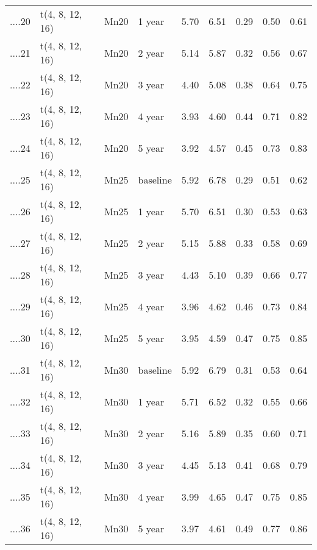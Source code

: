 \begin{table}[ht]
\begin{tabular}{rlllrrrrr}
  ....20 & t(4, 8, 12, 16) & Mn20 & 1 year & 5.70 & 6.51 & 0.29 & 0.50 & 0.61 \\ 
  ....21 & t(4, 8, 12, 16) & Mn20 & 2 year & 5.14 & 5.87 & 0.32 & 0.56 & 0.67 \\ 
  ....22 & t(4, 8, 12, 16) & Mn20 & 3 year & 4.40 & 5.08 & 0.38 & 0.64 & 0.75 \\ 
  ....23 & t(4, 8, 12, 16) & Mn20 & 4 year & 3.93 & 4.60 & 0.44 & 0.71 & 0.82 \\ 
  ....24 & t(4, 8, 12, 16) & Mn20 & 5 year & 3.92 & 4.57 & 0.45 & 0.73 & 0.83 \\ 
  ....25 & t(4, 8, 12, 16) & Mn25 & baseline & 5.92 & 6.78 & 0.29 & 0.51 & 0.62 \\ 
  ....26 & t(4, 8, 12, 16) & Mn25 & 1 year & 5.70 & 6.51 & 0.30 & 0.53 & 0.63 \\ 
  ....27 & t(4, 8, 12, 16) & Mn25 & 2 year & 5.15 & 5.88 & 0.33 & 0.58 & 0.69 \\ 
  ....28 & t(4, 8, 12, 16) & Mn25 & 3 year & 4.43 & 5.10 & 0.39 & 0.66 & 0.77 \\ 
  ....29 & t(4, 8, 12, 16) & Mn25 & 4 year & 3.96 & 4.62 & 0.46 & 0.73 & 0.84 \\ 
  ....30 & t(4, 8, 12, 16) & Mn25 & 5 year & 3.95 & 4.59 & 0.47 & 0.75 & 0.85 \\ 
  ....31 & t(4, 8, 12, 16) & Mn30 & baseline & 5.92 & 6.79 & 0.31 & 0.53 & 0.64 \\ 
  ....32 & t(4, 8, 12, 16) & Mn30 & 1 year & 5.71 & 6.52 & 0.32 & 0.55 & 0.66 \\ 
  ....33 & t(4, 8, 12, 16) & Mn30 & 2 year & 5.16 & 5.89 & 0.35 & 0.60 & 0.71 \\ 
  ....34 & t(4, 8, 12, 16) & Mn30 & 3 year & 4.45 & 5.13 & 0.41 & 0.68 & 0.79 \\ 
  ....35 & t(4, 8, 12, 16) & Mn30 & 4 year & 3.99 & 4.65 & 0.47 & 0.75 & 0.85 \\ 
  ....36 & t(4, 8, 12, 16) & Mn30 & 5 year & 3.97 & 4.61 & 0.49 & 0.77 & 0.86 \\ 
   \hline
\end{tabular}
\end{table}

